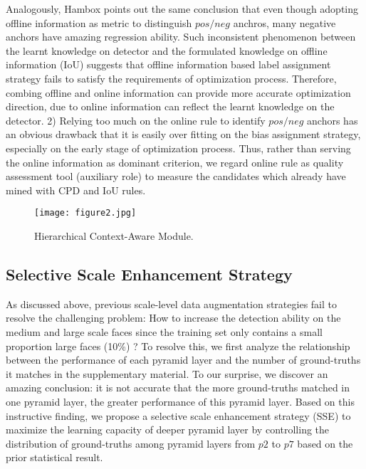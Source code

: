 \documentclass[10pt,twocolumn,letterpaper]{article}
\begin{document}
Analogously, Hambox \cite{liu2019hambox} points out the same conclusion that even though adopting offline information as metric to distinguish $pos/neg$ anchros, many negative anchors have amazing regression ability. Such inconsistent phenomenon between the learnt knowledge on detector and the formulated knowledge on offline information (IoU) suggests that offline information based label assignment strategy fails to satisfy the requirements of optimization process. Therefore, combing offline and online information can provide more accurate optimization direction, due to online information can reflect the learnt knowledge on the detector. 
2) Relying too much on  the online rule to identify $pos/neg$ anchors  has an obvious drawback that it is easily over fitting on the bias assignment strategy, especially on the early stage of optimization process. Thus, rather than serving the online information as dominant criterion, we regard online rule as quality assessment tool (auxiliary role) to measure the candidates which already have mined with CPD and IoU rules. 

\begin{figure*}[t]
    \centering
\texttt{[image: figure2.jpg]}
    \caption{Hierarchical Context-Aware Module.}
    \label{img2}
\end{figure*}

\subsection{Selective Scale Enhancement Strategy}
As discussed above, previous scale-level data augmentation strategies fail to resolve the challenging problem: How to increase the detection ability on the medium and large scale faces since the training set only contains a small proportion large faces (10\%) ? To resolve this, we first analyze the relationship between the performance of each pyramid layer and the number of ground-truths it matches in the supplementary material. To our surprise, we discover an amazing conclusion:  it  is  not  accurate  that  the  more ground-truths matched in one pyramid layer, the greater  performance  of  this  pyramid  layer. Based on this instructive finding, we propose a selective scale enhancement strategy (SSE) to maximize the learning capacity of deeper pyramid layer by controlling the distribution of ground-truths among pyramid layers from $p2$ to $p7$ based on the prior statistical result.
\end{document}
